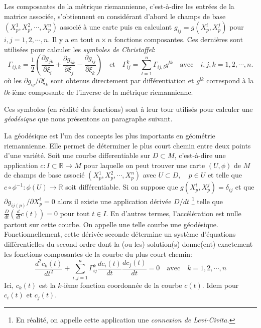 \documentclass[11pt,french]{article}
\begin{document}
Les composantes de la métrique riemannienne, c'est-à-dire les entrées de la matrice associée, s'obtiennent en considérant d'abord le champs de base $(X_p^1, X_p^2, \cdots, X_p^n)$ associé à une carte puis en calculant $g_{ij}=g(X_p^i, X_p^j)$ pour $i,j=1,2,\cdots, n.$ Il y a en tout $n\times  n$ fonctions composantes. Ces dernières sont utilisées pour calculer les \textit{symboles de Christoffel}:
\begin{equation}\label{christoffel_symbs}
    \Gamma_{ij,k}=\frac{1}{2}\left(\frac{\partial g_{jk}}{\partial\xi_{i}}+\frac{\partial g_{ik}}{\partial\xi_{j}}-\frac{\partial g_{ij}}{\partial\xi_{k}}\right) \quad\text{et}\quad \Gamma_{ij}^k=\sum_{l=1}^n\Gamma_{ij, l}g^{lk} \quad\text{avec}\quad i,j,k=1,2, \cdots, n.
\end{equation}
où les $ \partial g_{ij}/\partial\xi_k$ sont obtenus directement par différentiation et $g^{lk}$ correspond à la $lk$-ième composante de l'inverse de la métrique riemannienne.

Ces symboles (en réalité des fonctions) sont à leur tour utilisés pour calculer une \textit{géodésique} que nous présentons au paragraphe suivant.
\newline

La géodésique est l'un des concepts les plus importants en géométrie riemannienne. Elle permet de déterminer le plus court chemin entre deux points d'une variété. Soit une courbe differentiable sur $D\subset M$, c'est-à-dire une application $c\colon I\subset\mathbb{R}\longrightarrow M$ pour laquelle on peut trouver une carte $(U, \phi)$ de $M$ de champs de base associé  $(X_p^1, X_p^2, \cdots, X_p^n)$ avec $U\subset D,\quad p\in U$ et telle que $c\circ\phi^{-1}\colon\phi(U)\longrightarrow\mathbb{R}$ soit différentiable. 
Si on suppose que $g(X_p^i, X_p^j)=\delta_{ij}$ et que $\partial g_{ij(p)}/\partial X_p^i=0$ alors il existe une application dérivée $D/dt$ \footnote{En réalité, on appelle cette application une \textit{connexion de Levi-Civita.}} telle que $\frac{D}{dt}\left(\frac{d}{dt}c(t)\right)=0$ pour tout $t\in I$. En d'autres termes, l'accélération est nulle partout sur cette courbe. On appelle une telle courbe une géodésique. Fonctionnellement, cette dérivée seconde détermine un système d'équations différentielles du second ordre dont la (ou les) solution(s) donne(ent) exactement les fonctions composantes de la courbe du plus court chemin:\\
\begin{equation}\label{geodesics_equn}
    \frac{d^2c_k(t)}{dt^2}+ \sum_{i,j=1}^n \Gamma_{ij}^k\frac{dc_i(t)}{dt}\frac{dc_j(t)}{dt}=0\quad \text{avec}\quad k=1, 2, \cdots, n
\end{equation}
Ici, $c_k(t)$ est la $k$-ième fonction coordonnée de la courbe $c(t)$. Idem pour $c_i(t)$ et $c_j(t)$.\\
\end{document}
